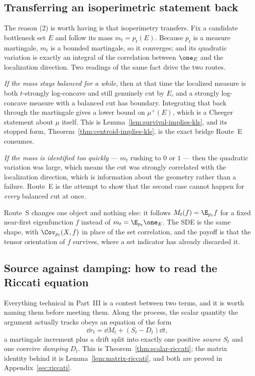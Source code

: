 \documentclass[../../main.tex]{subfiles}
\begin{document}
\subsection{Transferring an isoperimetric statement back}
\label{subsec:prelude-transfer}

The reason (2) is worth having is that isoperimetry transfers. Fix a candidate bottleneck set
$E$ and follow its mass $m_t=p_t(E)$. Because $p_t$ is a measure martingale, $m_t$ is a bounded
martingale, so it converges; and its quadratic variation is exactly an integral of the
correlation between $\one_E$ and the localization direction. Two readings of the same fact drive
the two routes.

\emph{If the mass stays balanced for a while}, then at that time the localized measure is both
$t$-strongly log-concave and still genuinely cut by $E$, and a strongly log-concave measure with a
balanced cut has boundary. Integrating that back through the martingale gives a lower bound on
$\mu^+(E)$, which is a Cheeger statement about $\mu$ itself. This is
Lemma~\ref{lem:survival-implies-kls}, and its stopped form,
Theorem~\ref{thm:centroid-implies-kls}, is the exact bridge Route~E consumes.

\emph{If the mass is identified too quickly} --- $m_t$ rushing to $0$ or $1$ --- then the
quadratic variation was large, which means the cut was strongly correlated with the localization
direction, which is information about the geometry rather than a failure. Route~E is the attempt
to show that the second case cannot happen for \emph{every} balanced cut at once.

Route~S changes one object and nothing else: it follows $M_t(f)=\E_{p_t}f$ for a fixed near-first
eigenfunction $f$ instead of $m_t=\E_{p_t}\one_E$. The SDE is the same shape, with
$\Cov_{p_t}(X,f)$ in place of the set correlation, and the payoff is that the tensor orientation
of $f$ survives, where a set indicator has already discarded it.

\subsection{Source against damping: how to read the Riccati equation}
\label{subsec:prelude-riccati}

Everything technical in Part~III is a contest between two terms, and it is worth naming them
before meeting them. Along the process, the scalar quantity the argument actually tracks obeys an
equation of the form
\[
  \dd r_t=\dd M_t+(S_t-D_t)\dd t ,
\]
a martingale increment plus a drift split into exactly one positive \emph{source} $S_t$ and one
coercive \emph{damping} $D_t$. This is Theorem~\ref{thm:scalar-riccati}; the matrix identity
behind it is Lemma~\ref{lem:matrix-riccati}, and both are proved in
Appendix~\ref{sec:riccati}.
\end{document}
